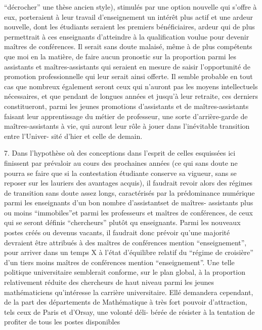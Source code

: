 
``décrocher'' une thèse ancien style), stimulés par une option nouvelle qui
s'offre à eux, porteraient à leur travail d'enseignement un intérêt plus actif
et une ardeur nouvelle, dont les étudiants seraient les premiers bénéficiaires,
ardeur qui de plus permettrait à ces enseignants d'atteindre à la qualification
voulue pour devenir maîtres de conférences. Il serait sans doute malaisé,
même à de plus compétents que moi en la matière, de faire aucun pronostic sur
la proportion parmi les assistants et maîtres-assistants qui seraient en mesure
de saisir l'opportunité de promotion professionnelle qui leur serait ainsi
offerte. Il semble probable en tout cas que nombreux également seront ceux
qui n'auront pas les moyens intellectuels nécessaires, et que pendant de longues
années et jusqu'à leur retraite, ces derniers constitueront, parmi les jeunes
promotions d'assistants et de maîtres-assistants faisant leur apprentissage
du métier de professeur, une sorte d'arrière-garde de maîtres-assistants à
vie, qui auront leur rôle à jouer dans l'inévitable transition entre l'Univer-%
sité d'hier et celle de demain.

7. Dans l'hypothèse où des conceptions dans l'esprit de celles esquissées ici
finissent par prévaloir au cours des prochaines années (ce qui sans doute ne
pourra se faire que si la contestation étudiante conserve sa vigueur, sans se
reposer sur les lauriers des avantages acquis), il faudrait revoir alors des
régimes de transition sans doute assez longs, caractérisés par la prédominance
numérique parmi les enseignants d'un bon nombre d'assistants\hand{,}et de maîtres- 
assistants plus ou moins ``immobiles''\hand{,}et parmi les professeurs et maîtres de
conférences, de ceux qui se seront définis ``chercheurs'' plutôt \hand{\unsure{$\wedge$}}qu enseignants.
Parmi les nouveaux postes créés ou devenus vacants, il faudrait donc prévoir
qu'une majorité devraient être attribués à des maîtres de conférences mention
``enseignement'', pour arriver dans un temps X à l'état d'équilibre relatif du
``régime de croisière'' d'un tiers  moins  maîtres de conférences mention 
``enseignement''. Une telle politique universitaire semblerait conforme, sur
le plan global, à la proportion relativement réduite des chercheurs de haut
niveau parmi les jeunes mathématiciens qu'intéresse la carrière universitaire.
Ellé demandera cependant, de la part des départements de Mathématique à très
fort pouvoir d'attraction, tels ceux de Paris et d'Orsay, une volonté déli-%
bérée de résister à la tentation de profiter de tous les postes disponibles

